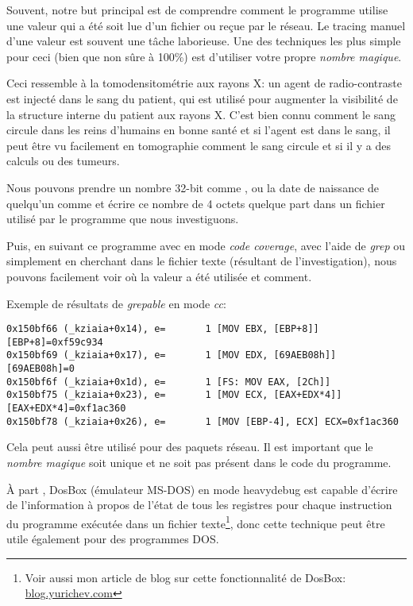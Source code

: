 
Souvent, notre but principal est de comprendre comment le programme utilise une valeur
qui a été soit lue d'un fichier ou reçue par le réseau. Le tracing manuel d'une valeur
est souvent une tâche laborieuse. Une des techniques les plus simple pour ceci (bien
que non sûre à 100\%) est d'utiliser votre propre \emph{nombre magique}.

Ceci ressemble à la tomodensitométrie aux rayons X: un agent de radio-contraste est
injecté dans le sang du patient, qui est utilisé pour augmenter la visibilité de
la structure interne du patient aux rayons X.
C'est bien connu comment le sang circule dans les reins d'humains en bonne santé
et si l'agent est dans le sang, il peut être vu facilement en tomographie comment
le sang circule et si il y a des calculs ou des tumeurs.

Nous pouvons prendre un nombre 32-bit comme , ou la date de naissance
de quelqu'un comme  et écrire ce nombre de 4 octets quelque part dans
un fichier utilisé par le programme que nous investiguons.

\myindex{\GrepUsage}

Puis, en suivant ce programme avec \tracer en mode \emph{code coverage}, avec l'aide
de \emph{grep} ou simplement en cherchant dans le fichier texte (résultant de l'investigation),
nous pouvons facilement voir où la valeur a été utilisée et comment.

Exemple de résultats de \tracer \emph{grepable} en mode \emph{cc}:

\begin{lstlisting}[style=customasmx86]
0x150bf66 (_kziaia+0x14), e=       1 [MOV EBX, [EBP+8]] [EBP+8]=0xf59c934
0x150bf69 (_kziaia+0x17), e=       1 [MOV EDX, [69AEB08h]] [69AEB08h]=0
0x150bf6f (_kziaia+0x1d), e=       1 [FS: MOV EAX, [2Ch]]
0x150bf75 (_kziaia+0x23), e=       1 [MOV ECX, [EAX+EDX*4]] [EAX+EDX*4]=0xf1ac360
0x150bf78 (_kziaia+0x26), e=       1 [MOV [EBP-4], ECX] ECX=0xf1ac360
\end{lstlisting}

Cela peut aussi être utilisé pour des paquets réseau.
Il est important que le \emph{nombre magique} soit unique et ne soit pas présent
dans le code du programme.

\newcommand{\DOSBOXURL}{\href{http://go.yurichev.com/17222}{blog.yurichev.com}}

À part \tracer, DosBox (émulateur MS-DOS) en mode heavydebug est capable d'écrire
de l'information à propos de l'état de tous les registres pour chaque instruction
du programme exécutée dans un fichier texte\footnote{Voir aussi mon article de blog
sur cette fonctionnalité de DosBox: \DOSBOXURL{}}, donc cette technique peut être
utile également pour des programmes DOS.
